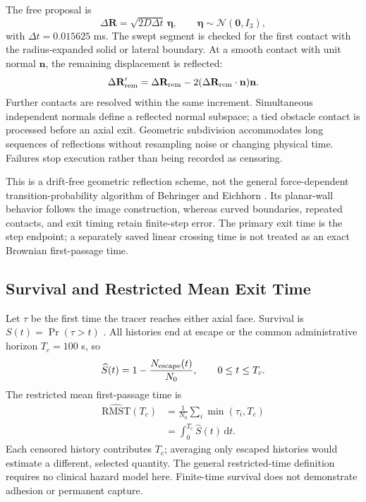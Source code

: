 The free proposal is
\begin{equation}
\Delta\mathbf R=\sqrt{2D\Delta t}\,\boldsymbol\eta,
\qquad\boldsymbol\eta\sim\mathcal N(\mathbf0,I_3),
\label{eq:tracer-transport}
\end{equation}
with $\Delta t=0.015625$ ms. The swept segment is checked for the first contact with the radius-expanded solid or lateral boundary. At a smooth contact with unit normal $\mathbf n$, the remaining displacement is reflected:
\begin{equation}
\Delta\mathbf R_{\rm rem}'=\Delta\mathbf R_{\rm rem}
-2(\Delta\mathbf R_{\rm rem}\cdot\mathbf n)\mathbf n.
\label{eq:reflection}
\end{equation}
Further contacts are resolved within the same increment. Simultaneous independent normals define a reflected normal subspace; a tied obstacle contact is processed before an axial exit. Geometric subdivision accommodates long sequences of reflections without resampling noise or changing physical time. Failures stop execution rather than being recorded as censoring.

This is a drift-free geometric reflection scheme, not the general force-dependent transition-probability algorithm of Behringer and Eichhorn \cite{BehringerEichhorn2012}. Its planar-wall behavior follows the image construction, whereas curved boundaries, repeated contacts, and exit timing retain finite-step error. The primary exit time is the step endpoint; a separately saved linear crossing time is not treated as an exact Brownian first-passage time.

\subsection{Survival and Restricted Mean Exit Time}
Let $\tau$ be the first time the tracer reaches either axial face. Survival is $S(t)=\Pr(\tau>t)$ \cite{Redner2001}. All histories end at escape or the common administrative horizon $T_c=100$ s, so
\begin{equation}
\widehat S(t)=1-\frac{N_{\rm escape}(t)}{N_0},
\qquad 0\le t\le T_c.
\label{eq:survival-probability}
\end{equation}
The restricted mean first-passage time is
\begin{equation}
\begin{aligned}
\widehat{\mathrm{RMST}}(T_c)
&=\frac1{N_0}\sum_i\min(\tau_i,T_c)\\
&=\int_0^{T_c}\widehat S(t)\,\mathrm dt.
\end{aligned}
\label{eq:restricted-met}
\end{equation}
Each censored history contributes $T_c$; averaging only escaped histories would estimate a different, selected quantity. The general restricted-time definition \cite{RoystonParmar2013} requires no clinical hazard model here. Finite-time survival does not demonstrate adhesion or permanent capture.

